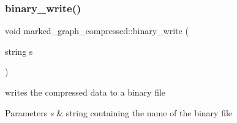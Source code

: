 \subsubsection{\texorpdfstring{binary\+\_\+write()}{binary\_write()}\hspace{0.1cm}{\footnotesize\ttfamily [2/2]}}
{\footnotesize\ttfamily void marked\+\_\+graph\+\_\+compressed\+::binary\+\_\+write (\begin{DoxyParamCaption}\item[{string}]{s }\end{DoxyParamCaption})}

writes the compressed data to a binary file 
\begin{DoxyParams}{Parameters}
{\em s} & string containing the name of the binary file \\
\hline
\end{DoxyParams}

